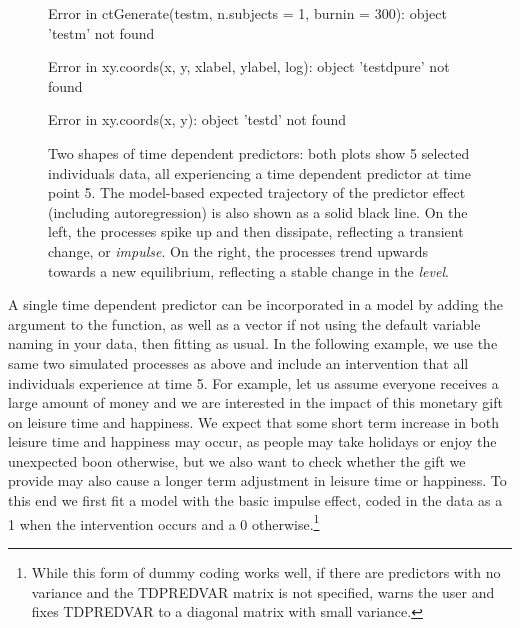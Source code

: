 \documentclass[nojss]{jss}\usepackage[]{graphicx}\usepackage[]{color}
\begin{document}
\begin{figure}[!h]
\begin{Schunk}
\begin{Soutput}
\end{Soutput}
\begin{Soutput}
Error in ctGenerate(testm, n.subjects = 1, burnin = 300): object 'testm' not found
\end{Soutput}
\begin{Soutput}
Error in xy.coords(x, y, xlabel, ylabel, log): object 'testdpure' not found
\end{Soutput}
\begin{Soutput}
Error in xy.coords(x, y): object 'testd' not found
\end{Soutput}
\end{Schunk}
\caption{ \label{fig:tdpredtypes} Two shapes of time dependent predictors: both plots show 5 selected individuals data, all experiencing a time dependent predictor at time point 5. The model-based expected trajectory of the predictor effect (including autoregression) is also shown as a solid black line. On the left, the processes spike up and then dissipate, reflecting a transient change, or \textit{impulse}. On the right, the processes trend upwards towards a new equilibrium, reflecting a stable change in the \textit{level}.}
\end{figure}

A single time dependent predictor can be incorporated in a  model by adding the argument  to the  function, as well as a  vector if not using the default variable naming in your data, then fitting as usual. In the following example, we use the same two simulated processes as above and include an intervention that all individuals experience at time 5. For example, let us assume everyone receives a large amount of money and we are interested in the impact of this monetary gift on leisure time and happiness. We expect that some short term increase in both leisure time and happiness may occur, as people may take holidays or enjoy the unexpected boon otherwise, but we also want to check whether the gift we provide may also cause a longer term adjustment in leisure time or happiness. To this end we first fit a model with the basic impulse effect, coded in the data as a 1 when the intervention occurs and a 0 otherwise.\footnote{While this form of dummy coding works well, if there are predictors with no variance and the TDPREDVAR matrix is not specified,  warns the user and fixes TDPREDVAR to a diagonal matrix with small variance.}   
\end{document}
